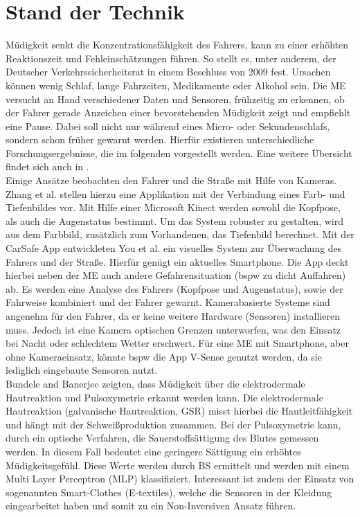 {\section{Stand der Technik}
\label{chap:me}
Müdigkeit senkt die Konzentrationsfähigkeit des Fahrers, kann zu einer erhöhten Reaktionszeit und Fehleinschätzungen führen. So stellt es, unter anderem, der Deutscher Verkehrssicherheitsrat in einem Beschluss von 2009 \cite{DVR:Online} fest. Ursachen können wenig Schlaf, lange Fahrzeiten, Medikamente oder Alkohol sein.
Die \acl{ME} versucht an Hand verschiedener Daten und Sensoren, frühzeitig zu erkennen, ob der Fahrer gerade Anzeichen einer bevorstehenden Müdigkeit zeigt und empfiehlt eine Pause. Dabei soll nicht nur während eines Micro- oder Sekundenschlafs, sondern schon früher gewarnt werden. Hierfür existieren unterschiedliche Forschungsergebnisse, die im folgenden vorgestellt werden. Eine weitere Übersicht findet sich auch in \cite{Sahayadhas_121216937}.\\

Einige Ansätze beobachten den Fahrer und die Straße mit Hilfe von Kameras. Zhang et al. \cite{Zhang:2015:RSD:2753829.2629482} stellen hierzu eine Applikation mit der Verbindung eines Farb- und Tiefenbildes vor. Mit Hilfe einer Microsoft Kinect werden sowohl die Kopfpose, als auch die Augenstatus bestimmt. Um das System robuster zu gestalten, wird aus dem Farbbild,  zusätzlich zum Vorhandenen, das Tiefenbild berechnet. Mit der CarSafe App entwickleten You et al. \cite{You:2013:CAA:2462456.2465428} ein visuelles System zur Überwachung des Fahrers und der Straße. Hierfür genügt ein aktuelles Smartphone. Die App deckt hierbei neben der \acl{ME} auch andere Gefahrensituation (\acl{bspw} zu dicht Auffahren) ab. Es werden eine Analyse des Fahrers (Kopfpose und Augenstatus), sowie der Fahrweise kombiniert und der Fahrer gewarnt. Kamerabasierte Systeme sind angenehm für den Fahrer, da er keine weitere Hardware (Sensoren) installieren muss. Jedoch ist eine Kamera optischen Grenzen unterworfen, was den Einsatz bei Nacht oder schlechtem Wetter erschwert. Für eine \acl{ME} mit Smartphone, aber ohne Kameraeinsatz, könnte \acl{bspw} die App V-Sense \cite{Chen:2015:ISV:2742647.2742659} genutzt werden, da sie lediglich  eingebaute Sensoren nutzt.\\

Bundele and Banerjee \citep{Bundele:2009:DFV:1806338.1806478} zeigten, dass Müdigkeit über die elektrodermale Hautreaktion und Pulsoxymetrie erkannt werden kann. Die elektrodermale Hautreaktion (galvanische Hautreaktion, GSR) misst hierbei die Hautleitfähigkeit und hängt mit der Schweißproduktion zusammen. Bei der Pulsoxymetrie kann, durch ein optische Verfahren, die Sauerstoffsättigung des Blutes gemessen werden. In diesem Fall bedeutet eine geringere Sättigung ein erhöhtes Müdigkeitsgefühl. Diese Werte werden durch \acl{BS} ermittelt und werden mit einem Multi Layer Perceptron (MLP) klassifiziert. Interessant ist zudem der Einsatz von sogenannten Smart-Clothes (E-textiles), welche die Sensoren in der Kleidung eingearbeitet haben und somit zu ein Non-Inversiven Ansatz führen.\\

}
